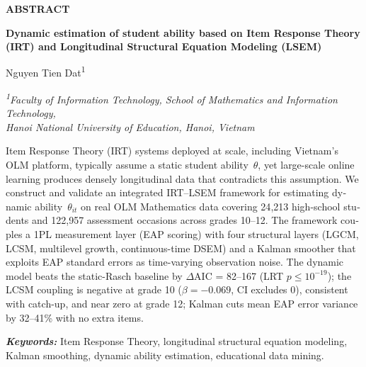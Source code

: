 
\begin{english}
\vspace{4pt}

\begin{center}
{\fontsize{11}{13}\bfseries\selectfont ABSTRACT}
\end{center}
\vspace{-6pt}
\begin{center}
{\fontsize{11}{13}\bfseries\selectfont
Dynamic estimation of student ability based on Item Response Theory (IRT) and Longitudinal Structural Equation Modeling (LSEM)}
\end{center}
\vspace{-6pt}
\begin{center}
{\fontsize{12}{14}\selectfont
Nguyen Tien Dat\textsuperscript{1}}
\end{center}
\vspace{-6pt}
\begin{center}
{\fontsize{11}{13}\itshape\selectfont
\textsuperscript{1}Faculty of Information Technology, School of Mathematics and Information Technology,\\
Hanoi National University of Education, Hanoi, Vietnam}
\end{center}

{\fontsize{11}{13}\selectfont
\noindent Item Response Theory (IRT) systems deployed at scale, including Vietnam's OLM platform, typically assume a static student ability~\(\theta\), yet large-scale online learning produces densely longitudinal data that contradicts this assumption. We construct and validate an integrated IRT--LSEM framework for estimating dynamic ability~\(\theta_{it}\) on real OLM Mathematics data covering 24{,}213 high-school students and 122{,}957 assessment occasions across grades 10--12. The framework couples a 1PL measurement layer (EAP scoring) with four structural layers (LGCM, LCSM, multilevel growth, continuous-time DSEM) and a Kalman smoother that exploits EAP standard errors as time-varying observation noise. The dynamic model beats the static-Rasch baseline by \(\Delta\)AIC = 82--167 (LRT \(p \le 10^{-19}\)); the LCSM coupling is negative at grade 10 (\(\beta = -0.069\), CI excludes 0), consistent with catch-up, and near zero at grade 12; Kalman cuts mean EAP error variance by 32--41\% with no extra items.\par
\noindent\textbf{\textit{Keywords:}} Item Response Theory, longitudinal structural equation modeling, Kalman smoothing, dynamic ability estimation, educational data mining.
\par}
\end{english}
